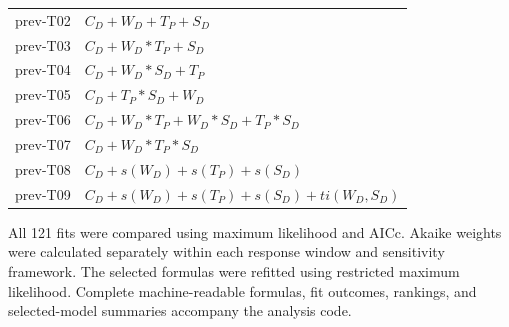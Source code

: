 \documentclass[insects,article,submit,pdftex,moreauthors]{Definitions/mdpi}
\begin{document}
\begin{appendix}
\begin{longtable}{@{}p{}p{}@{}}
prev-T02 & $C_D + W_D + T_P + S_D$ \\
prev-T03 & $C_D + W_D * T_P + S_D$ \\
prev-T04 & $C_D + W_D * S_D + T_P$ \\
prev-T05 & $C_D + T_P * S_D + W_D$ \\
prev-T06 & $C_D + W_D * T_P + W_D * S_D + T_P * S_D$ \\
prev-T07 & $C_D + W_D * T_P * S_D$ \\
prev-T08 & $C_D + s(W_D) + s(T_P) + s(S_D)$ \\
prev-T09 & $C_D + s(W_D) + s(T_P) + s(S_D) + ti(W_D,S_D)$ \\
\bottomrule
\end{longtable}

All 121 fits were compared using maximum likelihood and AICc. Akaike weights were calculated separately within each response window and sensitivity framework. The selected formulas were refitted using restricted maximum likelihood. Complete machine-readable formulas, fit outcomes, rankings, and selected-model summaries accompany the analysis code.

\end{appendix}


\end{document}
